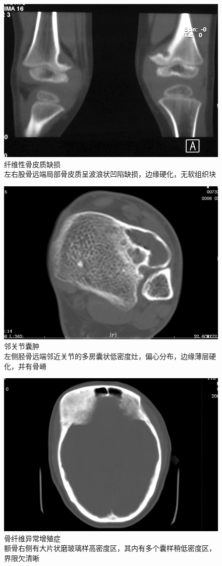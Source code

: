 \begin{figure}[!htbp]
 \centering
 \includegraphics[width=.7\textwidth,height=\textheight,keepaspectratio]{./images/Image00437.jpg}
 \captionsetup{justification=centering}
 \caption{纤维性骨皮质缺损\\{\small 左右股骨远端局部骨皮质呈波浪状凹陷缺损，边缘硬化，无软组织块}}
 \label{fig22-18}
  \end{figure} 

\begin{figure}[!htbp]
 \centering
 \includegraphics[width=.7\textwidth,height=\textheight,keepaspectratio]{./images/Image00438.jpg}
 \captionsetup{justification=centering}
 \caption{邻关节囊肿\\{\small 左侧胫骨远端邻近关节的多房囊状低密度灶，偏心分布，边缘薄层硬化，并有骨嵴}}
 \label{fig22-19}
  \end{figure} 

\begin{figure}[!htbp]
 \centering
 \includegraphics[width=.7\textwidth,height=\textheight,keepaspectratio]{./images/Image00439.jpg}
 \captionsetup{justification=centering}
 \caption{骨纤维异常增殖症\\{\small 额骨右侧有大片状磨玻璃样高密度区，其内有多个囊样稍低密度区，界限欠清晰}}
 \label{fig22-20}
  \end{figure} 

